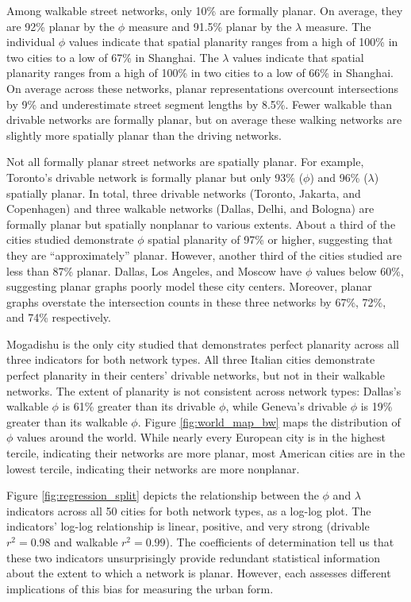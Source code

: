 \documentclass[Afour,sageh,times]{sagej}
\begin{document}
Among walkable street networks, only 10\% are formally planar. On average, they are 92\% planar by the $\phi$ measure and 91.5\% planar by the $\lambda$ measure. The individual $\phi$ values indicate that spatial planarity ranges from a high of 100\% in two cities to a low of 67\% in Shanghai. The $\lambda$ values indicate that spatial planarity ranges from a high of 100\% in two cities to a low of 66\% in Shanghai. On average across these networks, planar representations overcount intersections by 9\% and underestimate street segment lengths by 8.5\%. Fewer walkable than drivable networks are formally planar, but on average these walking networks are slightly more spatially planar than the driving networks.

Not all formally planar street networks are spatially planar. For example, Toronto's drivable network is formally planar but only 93\% ($\phi$) and 96\% ($\lambda$) spatially planar. In total, three drivable networks (Toronto, Jakarta, and Copenhagen) and three walkable networks (Dallas, Delhi, and Bologna) are formally planar but spatially nonplanar to various extents. About a third of the cities studied demonstrate $\phi$ spatial planarity of 97\% or higher, suggesting that they are \enquote{approximately} planar. However, another third of the cities studied are less than 87\% planar. Dallas, Los Angeles, and Moscow have $\phi$ values below 60\%, suggesting planar graphs poorly model these city centers. Moreover, planar graphs overstate the intersection counts in these three networks by 67\%, 72\%, and 74\% respectively.

Mogadishu is the only city studied that demonstrates perfect planarity across all three indicators for both network types. All three Italian cities demonstrate perfect planarity in their centers' drivable networks, but not in their walkable networks. The extent of planarity is not consistent across network types: Dallas's walkable $\phi$ is 61\% greater than its drivable $\phi$, while Geneva's drivable $\phi$ is 19\% greater than its walkable $\phi$. Figure \ref{fig:world_map_bw} maps the distribution of $\phi$ values around the world. While nearly every European city is in the highest tercile, indicating their networks are more planar, most American cities are in the lowest tercile, indicating their networks are more nonplanar.

Figure \ref{fig:regression_split} depicts the relationship between the $\phi$ and $\lambda$ indicators across all 50 cities for both network types, as a log-log plot. The indicators' log-log relationship is linear, positive, and very strong (drivable $r^2=0.98$ and walkable $r^2=0.99$). The coefficients of determination tell us that these two indicators unsurprisingly provide redundant statistical information about the extent to which a network is planar. However, each assesses different implications of this bias for measuring the urban form.
\end{document}
